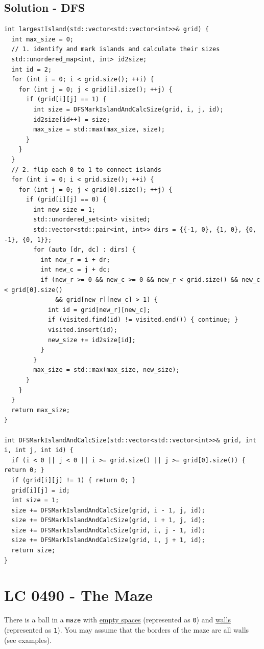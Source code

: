 \subsection*{Solution - DFS}
\begin{lstlisting}
int largestIsland(std::vector<std::vector<int>>& grid) {
  int max_size = 0;
  // 1. identify and mark islands and calculate their sizes
  std::unordered_map<int, int> id2size;
  int id = 2;
  for (int i = 0; i < grid.size(); ++i) {
    for (int j = 0; j < grid[i].size(); ++j) {
      if (grid[i][j] == 1) {
        int size = DFSMarkIslandAndCalcSize(grid, i, j, id);
        id2size[id++] = size;
        max_size = std::max(max_size, size);
      }
    }
  }
  // 2. flip each 0 to 1 to connect islands
  for (int i = 0; i < grid.size(); ++i) {
    for (int j = 0; j < grid[0].size(); ++j) {
      if (grid[i][j] == 0) {
        int new_size = 1;
        std::unordered_set<int> visited;
        std::vector<std::pair<int, int>> dirs = {{-1, 0}, {1, 0}, {0, -1}, {0, 1}};
        for (auto [dr, dc] : dirs) {
          int new_r = i + dr;
          int new_c = j + dc;
          if (new_r >= 0 && new_c >= 0 && new_r < grid.size() && new_c < grid[0].size()
              && grid[new_r][new_c] > 1) {
            int id = grid[new_r][new_c];
            if (visited.find(id) != visited.end()) { continue; }
            visited.insert(id);
            new_size += id2size[id];
          }
        }
        max_size = std::max(max_size, new_size);
      }
    }
  }
  return max_size;
}

int DFSMarkIslandAndCalcSize(std::vector<std::vector<int>>& grid, int i, int j, int id) {
  if (i < 0 || j < 0 || i >= grid.size() || j >= grid[0].size()) { return 0; }
  if (grid[i][j] != 1) { return 0; }
  grid[i][j] = id;
  int size = 1;
  size += DFSMarkIslandAndCalcSize(grid, i - 1, j, id);
  size += DFSMarkIslandAndCalcSize(grid, i + 1, j, id);
  size += DFSMarkIslandAndCalcSize(grid, i, j - 1, id);
  size += DFSMarkIslandAndCalcSize(grid, i, j + 1, id);
  return size;
}
\end{lstlisting}

\section{LC 0490 - The Maze}
There is a ball in a {\colorbox{CodeBackground}{\lstinline|maze|}} with \ul{empty spaces} (represented as {\colorbox{CodeBackground}{\lstinline|0|}}) and \ul{walls} (represented as {\colorbox{CodeBackground}{\lstinline|1|}}). You may assume that the borders of the maze are all walls (see examples). \\

